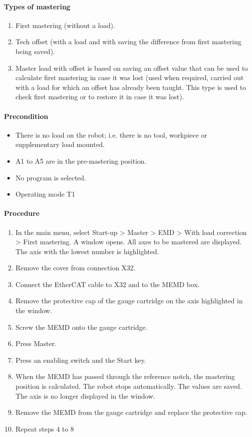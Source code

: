 \paragraph{Types of mastering}
\begin{enumerate}
	\item First mastering (without a load).
	\item Tech offset (with a load and with saving the difference from first mastering being saved).
	\item Master load with offset is based on saving an offset value that can be used to calculate first mastering in case it was lost (used when required, carried out with a load for which an offset has already been taught. This type is used to check first mastering or to restore it in case it was lost).
\end{enumerate}

\paragraph{Precondition}
\begin{itemize}
	\item There is no load on the robot; i.e. there is no tool, workpiece or supplementary load mounted.
	\item A1 to A5 are in the pre-mastering position.
	\item No program is selected.
	\item Operating mode T1
\end{itemize}

\paragraph{Procedure}
\begin{enumerate}
	\item In the main menu, select Start-up > Master > EMD > With load correction > First mastering. A window opens. All axes to be mastered are displayed. The axis with the lowest number is highlighted.
	\item Remove the cover from connection X32.
	\item Connect the EtherCAT cable to X32 and to the MEMD box.
	\item Remove the protective cap of the gauge cartridge on the axis highlighted in the window.
	\item Screw the MEMD onto the gauge cartridge.
	\item Press Master.
	\item Press an enabling switch and the Start key.
	\item When the MEMD has passed through the reference notch, the mastering position is calculated. The robot stops automatically. The values are saved. The axis is no longer displayed in the window.
	\item Remove the MEMD from the gauge cartridge and replace the protective cap.
	\item Repeat steps 4 to 8 
\end{enumerate}

